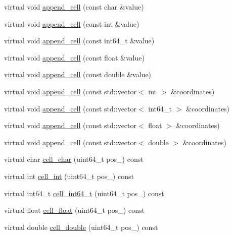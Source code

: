 \begin{DoxyCompactItemize}
\item 
virtual void \hyperlink{classCoordinateTile_a4a9c7b59ec820cd363f284f12490cead}{append\+\_\+cell} (const char \&value)
\item 
virtual void \hyperlink{classCoordinateTile_a530159b861b0ed55df38add74c217c39}{append\+\_\+cell} (const int \&value)
\item 
virtual void \hyperlink{classCoordinateTile_a0a818f6a5ecd35ee7c8be5f590d2770a}{append\+\_\+cell} (const int64\+\_\+t \&value)
\item 
virtual void \hyperlink{classCoordinateTile_a77e8b053fabbdfcf3a021c6ac276dda8}{append\+\_\+cell} (const float \&value)
\item 
virtual void \hyperlink{classCoordinateTile_a57965a6c40a0aeeced8e2ce26bedef48}{append\+\_\+cell} (const double \&value)
\item 
virtual void \hyperlink{classCoordinateTile_a1031406c4f7074b40e782fe217207b42}{append\+\_\+cell} (const std\+::vector$<$ int $>$ \&coordinates)
\item 
virtual void \hyperlink{classCoordinateTile_ac72935935ce1de72d19e3c2620ab8d91}{append\+\_\+cell} (const std\+::vector$<$ int64\+\_\+t $>$ \&coordinates)
\item 
virtual void \hyperlink{classCoordinateTile_adad817fb7d71acca0be30fc7e465d215}{append\+\_\+cell} (const std\+::vector$<$ float $>$ \&coordinates)
\item 
virtual void \hyperlink{classCoordinateTile_a4c2843cee79288be61c4c50c77281e13}{append\+\_\+cell} (const std\+::vector$<$ double $>$ \&coordinates)
\item 
virtual char \hyperlink{classCoordinateTile_a95234b5dbdfa07ac5b7af400108dffc5}{cell\+\_\+char} (uint64\+\_\+t pos\+\_\+) const 
\item 
virtual int \hyperlink{classCoordinateTile_a6a701fea1a0422e4272a3c3a3d8bb69c}{cell\+\_\+int} (uint64\+\_\+t pos\+\_\+) const 
\item 
virtual int64\+\_\+t \hyperlink{classCoordinateTile_a22d4a9bc85802c92a614534d1196b07e}{cell\+\_\+int64\+\_\+t} (uint64\+\_\+t pos\+\_\+) const 
\item 
virtual float \hyperlink{classCoordinateTile_a3d8fd5cb0b30f341dba7d70c0b5477b6}{cell\+\_\+float} (uint64\+\_\+t pos\+\_\+) const 
\item 
virtual double \hyperlink{classCoordinateTile_a11bde94e2c5bf6f04857a32f80c818a8}{cell\+\_\+double} (uint64\+\_\+t pos\+\_\+) const 
\item 

\end{DoxyCompactItemize}
